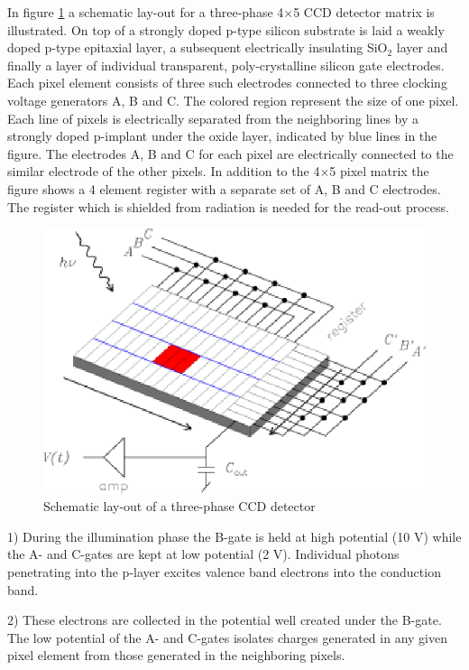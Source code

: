 In figure \ref{CCD.figschematic} a schematic lay-out for a three-phase
4$\times $5 CCD detector matrix is illustrated.  On top of a strongly
doped p-type silicon substrate is laid a weakly doped p-type epitaxial
layer, a subsequent electrically insulating SiO$_2$ layer and finally
a layer of individual transparent, poly-crystalline silicon gate
electrodes.  Each pixel element consists of three such electrodes
connected to three clocking voltage generators A, B and C. The colored
region represent the size of one pixel. Each line of pixels is
electrically separated from the neighboring lines by a strongly doped
p-implant under the oxide layer, indicated by blue lines in the
figure. The electrodes A, B and C for each pixel are electrically
connected to the similar electrode of the other pixels. In addition to
the 4$\times$5 pixel matrix the figure shows a 4 element register with
a separate set of A, B and C electrodes. The register which is
shielded from radiation is needed for the read-out process.

\begin{figure}[h]
  \centering
	\includegraphics{CCD_schematic.eps}
  \caption{Schematic lay-out of a three-phase CCD detector}
  \label{CCD.figschematic}
\end{figure}

1) During the illumination phase the B-gate is held at high potential
(10 V) while the A- and C-gates are kept at low potential (2
V). Individual photons penetrating into the p-layer excites valence
band electrons into the conduction band. 

2) These electrons are collected in the potential well created under
the B-gate. The low potential of the A- and C-gates isolates charges
generated in any given pixel element from those generated in the
neighboring pixels.


